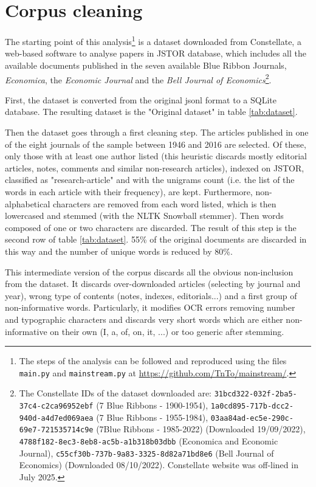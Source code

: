 \documentclass[a4paper, 11pt, headings=standardclasses, tablecaptionsbelow]{scrartcl}
\begin{document}
\section{Corpus cleaning}
The starting point of this analysis\footnote{The steps of the analysis can be followed and reproduced using the files \texttt{main.py} and \texttt{mainstream.py} at \url{https://github.com/TnTo/mainstream/}.} is a dataset downloaded from Constellate, a web-based software to analyse papers in JSTOR database, which includes all the available documents published in the seven available Blue Ribbon Journals, \textit{Economica}, the \textit{Economic Journal} and the \textit{Bell Journal of Economics}\footnote{The Constellate IDs of the dataset downloaded are: \texttt{31bcd322-032f-2ba5-37c4-c2ca96952ebf} (7 Blue Ribbons - 1900-1954), \texttt{1a0cd895-717b-dcc2-940d-a4d7ed069aea} (7 Blue Ribbons - 1955-1984), \texttt{03aa84ad-ec5e-290c-69e7-721535714c9e} (7Blue Ribbons - 1985-2022) (Downloaded 19/09/2022), \texttt{4788f182-8ec3-8eb8-ac5b-a1b318b03dbb} (Economica and Economic Journal), \texttt{c55cf30b-737b-9a83-3325-8d82a71bd8e6} (Bell Journal of Economics) (Downloaded 08/10/2022). Constellate website was off-lined in July 2025.}.



First, the dataset is converted from the original jsonl format to a SQLite database. The resulting dataset is the "Original dataset" in table \ref*{tab:dataset}.

Then the dataset goes through a first cleaning step. The articles published in one of the eight journals of the sample between 1946 and 2016 are selected. Of these, only those with at least one author listed (this heuristic discards mostly editorial articles, notes, comments and similar non-research articles), indexed on JSTOR, classified as "research-article" and with the unigrams count (i.e. the list of the words in each article with their frequency), are kept. Furthermore, non-alphabetical characters are removed from each word listed, which is then lowercased and stemmed (with the NLTK Snowball stemmer). Then words composed of one or two characters are discarded.
The result of this step is the second row of table \ref{tab:dataset}.
55\% of the original documents are discarded in this way and the number of unique words is reduced by 80\%.

This intermediate version of the corpus discards all the obvious non-inclusion from the dataset. It discards over-downloaded articles (selecting by journal and year), wrong type of contents (notes, indexes, editorials...) and a first group of non-informative words. Particularly, it modifies OCR errors removing number and typographic characters and discards very short words which are either non-informative on their own (I, a, of, on, it, ...) or too generic after stemming.
\end{document}
